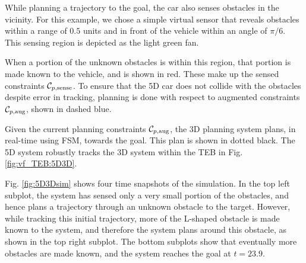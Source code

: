 While planning a trajectory to the goal, the car also senses obstacles in the vicinity.
For this example, we chose a simple virtual sensor that reveals obstacles within a range of $0.5$ units and in front of the vehicle within an angle of $\pi/6$.
This sensing region is depicted as the light green fan.

When a portion of the unknown obstacles is within this region, that portion is made known to the vehicle, and is shown in red.
These make up the sensed constraints $\mathcal C_{p,\text{sense}}$.
To ensure that the 5D car does not collide with the obstacles despite error in tracking, planning is done with respect to augmented constraints $\mathcal C_{p,\text{aug}}$, shown in dashed blue.

Given the current planning constraints $\mathcal C_{p,\text{aug}}$, the 3D planning system plans, in real-time using FSM, towards the goal.
This plan is shown in dotted black.
The 5D system robustly tracks the 3D system within the TEB in Fig. \ref{fig:vf_TEB:5D3D}.

Fig. \ref{fig:5D3Dsim} shows four time snapshots of the simulation.
In the top left subplot, the system has sensed only a very small portion of the obstacles, and hence plans a trajectory through an unknown obstacle to the target.
However, while tracking this initial trajectory, more of the L-shaped obstacle is made known to the system, and therefore the system plans around this obstacle, as shown in the top right subplot.
The bottom subplots show that eventually more obstacles are made known, and the system reaches the goal at $t=23.9$.

